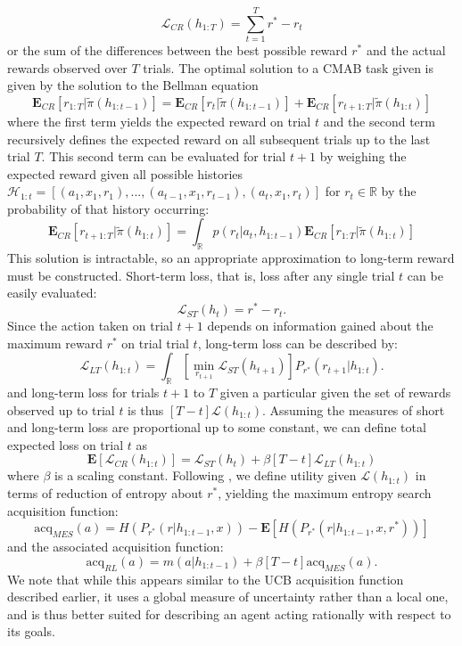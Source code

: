 \documentclass[10pt,letterpaper]{article}
\begin{document}
	$$\mathcal{L}_{CR}(h_{1:T}) = \sum_{t=1}^{T}r^{*} - r_{t}$$
	or the sum of the differences between the best possible reward $r^{*}$ and the actual rewards observed over $T$ trials. The optimal solution to a CMAB task given is given by the solution to the Bellman equation
	$$
	\mathbf{E}_{CR}[r_{1:T} | \tilde{\pi}( h_{1:t-1})] = \mathbf{E}_{CR}[r_{t} | \tilde{\pi}(h_{1:t-1})] + \mathbf{E}_{CR}[r_{t+1:T} | \tilde{\pi}( h_{1:t})]
	$$
	where the first term yields the expected reward on trial $t$ and the second term recursively defines the expected reward on all subsequent trials up to the last trial $T$. This second term can be evaluated for trial $t+1$ by weighing the expected reward given all possible histories $ \mathcal{H}_{1:t} = [(a_{1}, x_{1}, r_{1}),...,(a_{t-1}, x_{1}, r_{t-1}), (a_{t}, x_{1}, r_{t})]$ for $r_{t} \in \mathbb{R}$ by the probability of that history occurring:
	$$
	\mathbf{E}_{CR}[r_{t+1:T} | \tilde{\pi}( h_{1:t})] = \int_{\mathbb{R}} p(r_{t} | a_{t}, h_{1:t-1}) \mathbf{E}_{CR}[r_{1:T} | \tilde{\pi}( h_{1:t})]
	$$
	This solution is intractable, so an appropriate approximation to long-term reward must be constructed. Short-term loss, that is, loss after any single trial $t$ can be easily evaluated:
	$$\mathcal{L}_{ST}(h_{t}) = r^{*} - r_{t}.$$
	Since the action taken on trial $t+1$ depends on information gained about the maximum reward $r^{*}$ on trial trial $t$, long-term loss can be described by:
	$$
	\mathcal{L}_{LT}(h_{1:t}) = \int_{\mathbb{R}} [\min_{r_{t+1}} \mathcal{L}_{ST}(h_{t+1})] P_{r^{*}}(r_{t+1}|h_{1:t}).
	$$
	and long-term loss for trials $t+1$ to $T$ given a particular given the set of rewards observed up to trial $t$ is thus $[T-t] \mathcal{L}(h_{1:t})$. Assuming the measures of short and long-term loss are proportional up to some constant, we can define total expected loss on trial $t$ as
	$$
	\mathbf{E}[\mathcal{L}_{CR}(h_{1:t})] = \mathcal{L}_{ST}(h_{t}) + \beta[T-t] \mathcal{L}_{LT}(h_{1:t})
	$$
	where $\beta$ is a scaling constant. Following \cite{Wang}, we define utility given $\mathcal{L}(h_{1:t})$ in terms of reduction of entropy about $r^{*}$, yielding the maximum entropy search acquisition function:
	$$
	\text{acq}_{MES}(a) = H(P_{r^{*}}(r|h_{1:t-1}, x)) - \mathbf{E}[H(P_{r^{*}}(r|h_{1:t-1}, x, r^{*}))]
	$$
	and the associated acquisition function:
	$$
	\text{acq}_{RL}(a) = m(a|h_{1:t-1}) + \beta [T-t]\text{acq}_{MES}(a).
	$$
	We note that while this appears similar to the UCB acquisition function described earlier, it uses a global measure of uncertainty rather than a local one, and is thus better suited for describing an agent acting rationally with respect to its goals.
	
\end{document}

